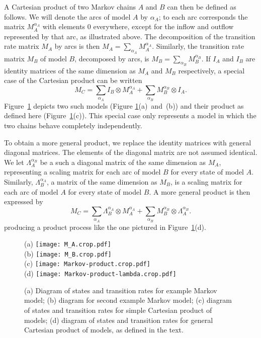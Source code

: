\documentclass[review]{elsarticle}
\newcommand{\hl}[1]{#1}
\begin{document}
A Cartesian product of two Markov chains $A$ and $B$ can then be defined as follows.
We will denote the arcs of model $A$ by $\alpha_A$; to each arc corresponds the matrix $M_A^{\alpha_A}$
with elements 0 everywhere, except for the inflow and outflow represented by that arc, as illustrated
above.
The decomposition of the transition rate matrix $M_A$ by arcs is then $M_A = \sum_{\alpha_A} M_A^{\alpha_A}$.
Similarly, the transition rate matrix $M_B$ of model $B$, decomposed by arcs, is
$M_B = \sum_{\alpha_B} M_B^{\alpha_B}$.  If $I_A$ and $I_B$ are identity matrices of the same dimension as
$M_A$ and $M_B$ respectively, a special case of the Cartesian product can be written
\[
M_C = \sum_{\alpha_A} 
I_B \otimes M_A^{\alpha_A} + \sum_{\alpha_B} M_B^{\alpha_B} \otimes I_A.
\]
\hl{Figure~\mbox{\ref{fig:Markov-products}}} depicts two
such models (\hl{Figure \mbox{\ref{fig:Markov-products}}(a)~and~(b)})
and their product as defined here
(\hl{Figure~\mbox{\ref{fig:Markov-products}(c)}}).
This special case only represents a model in which
the two chains behave completely independently.  

To obtain a more general product, we replace the identity matrices with general diagonal matrices.  
The elements of the diagonal matrix are not assumed identical.
We let $\Lambda_A^{\alpha_B}$ be a such a diagonal
matrix of the same dimension as $M_A$, representing
a scaling matrix for each arc of model $B$ for every state of model $A$.  Similarly, $\Lambda_B^{\alpha_A}$,
a matrix of the same dimension as $M_B$, 
is a scaling matrix for each arc of model $A$ for every state of model $B$.  A more general product is then
expressed by
\[
M_C = \sum_{\alpha_A} \Lambda_B^{\alpha_A} \otimes M_A^{\alpha_A} + \sum_{\alpha_B} M_B^{\alpha_B} \otimes \Lambda_A^{\alpha_B}.
\]
producing a product process like the one pictured in
\hl{Figure~\mbox{\ref{fig:Markov-products}}(d)}.



\begin{figure}
\centering
(a) %
\texttt{[image: M\_A.crop.pdf]}
%
\\
(b) %
\texttt{[image: M\_B.crop.pdf]}
%
\\
(c) %
\texttt{[image: Markov-product.crop.pdf]}
%
\\
(d) %
\texttt{[image: Markov-product-lambda.crop.pdf]}
%
\caption{ \label{fig:Markov-products}
(a) Diagram of states and transition rates for example Markov model;
(b) diagram for second example Markov model;
(c) diagram of states and transition rates for simple Cartesian product
of models;
(d) diagram of states and transition rates for general Cartesian product
of models, as defined in the text.
}
\end{figure}
\end{document}
